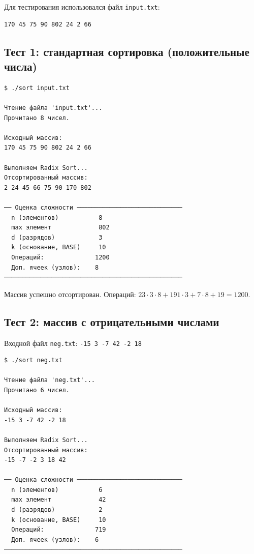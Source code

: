 \documentclass[a4paper,14pt]{extarticle}
\begin{document}
Для тестирования использовался файл \texttt{input.txt}:
\begin{Verbatim}[frame=single,fontsize=\footnotesize]
170 45 75 90 802 24 2 66
\end{Verbatim}

\subsection{Тест 1: стандартная сортировка (положительные числа)}

\begin{Verbatim}[frame=single,fontsize=\footnotesize]
$ ./sort input.txt

Чтение файла 'input.txt'...
Прочитано 8 чисел.

Исходный массив:
170 45 75 90 802 24 2 66

Выполняем Radix Sort...
Отсортированный массив:
2 24 45 66 75 90 170 802

── Оценка сложности ─────────────────────────────
  n (элементов)           8
  max элемент             802
  d (разрядов)            3
  k (основание, BASE)     10
  Операций:              1200
  Доп. ячеек (узлов):    8
─────────────────────────────────────────────────
\end{Verbatim}

Массив успешно отсортирован. Операций: $23\cdot3\cdot8 + 191\cdot3 + 7\cdot8 + 19 = 1200$.

\subsection{Тест 2: массив с отрицательными числами}

Входной файл \texttt{neg.txt}: \texttt{-15 3 -7 42 -2 18}

\begin{Verbatim}[frame=single,fontsize=\footnotesize]
$ ./sort neg.txt

Чтение файла 'neg.txt'...
Прочитано 6 чисел.

Исходный массив:
-15 3 -7 42 -2 18

Выполняем Radix Sort...
Отсортированный массив:
-15 -7 -2 3 18 42

── Оценка сложности ─────────────────────────────
  n (элементов)           6
  max элемент             42
  d (разрядов)            2
  k (основание, BASE)     10
  Операций:              719
  Доп. ячеек (узлов):    6
─────────────────────────────────────────────────
\end{Verbatim}
\end{document}
